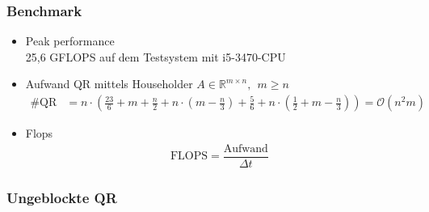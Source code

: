 

\begin{frame}
\frametitle{Benchmark}
	\begin{itemize}
		\item Peak performance \\
		25,6 GFLOPS auf dem Testsystem mit i5-3470-CPU
		\item Aufwand QR mittels Householder $A \in \mathbb{R}^{m \times n},~~ m \ge n$
		\begin{align*}
			\#\text{QR} &= n\cdot\left( \frac{23}{6}+m+\frac{n}{2} + n\cdot\left(m-\frac{n}{3}\right) + \frac{5}{6} + n\cdot\left(\frac{1}{2} + m-\frac{n}{3}\right) \right) = \mathcal{O}(n^2m)
		\end{align*}
		\item Flops
		\begin{align*}
			\text{FLOPS} = \dfrac{\text{Aufwand}}{\Delta t}
		\end{align*}
	\end{itemize}
\end{frame}

\begin{frame}
	\frametitle{Ungeblockte QR}
	\centering
\end{frame}



